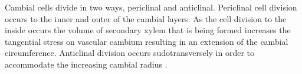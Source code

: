 Cambial cells divide in two ways, periclinal and anticlinal. Periclinal cell
division occurs to the inner and outer of the cambial layers. As the cell
division to the inside occurs the volume of secondary xylem that is being formed
increases the tangential stress on vascular cambium resulting in an extension of
the cambial circumference. Anticlinal division occurs sudotransversely in order to accommodate the increasing cambial radius \cite{fromm2013cellular}.
